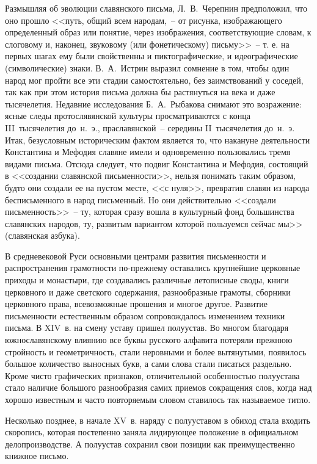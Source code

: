   Размышляя об эволюции славянского письма, Л.~В.~Черепнин предположил, что оно
  прошло <<путь, общий всем народам,~-- от рисунка, изображающего определенный
  образ или понятие, через изображения, соответствующие словам, к слоговому и,
  наконец, звуковому (или фонетическому) письму>>~-- т. е. на первых шагах ему
  были свойственны и пиктографические, и идеографические (символические) знаки.
  В.~А.~Истрин выразил сомнение в том, чтобы один народ мог пройти все эти
  стадии самостоятельно, без заимствований у соседей, так как при этом история
  письма должна бы растянуться на века и даже тысячелетия. Недавние
  исследования Б.~А.~Рыбакова снимают это возражение: ясные следы
  протослявянской культуры просматриваются с конца III~тысячелетия до~н.~э.,
  праславянской~-- середины II~тысячелетия до~н.~э. Итак, безусловным
  историческим фактом является то, что накануне деятельности Константина и
  Мефодия славяне имели и одновременно пользовались тремя видами письма. Отсюда
  следует, что подвиг Константина и Мефодия, состоящий в <<создании славянской
  письменности>>, нельзя понимать таким образом, будто они создали ее на пустом
  месте, <<с нуля>>, превратив славян из народа бесписьменного в народ
  письменный. Но они действительно <<создали письменность>>~-- ту, которая
  сразу вошла в культурный фонд большинства славянских народов, ту, развитым
  вариантом которой пользуемся сейчас мы>> (славянская азбука).
  
  В средневековой Руси основными центрами развития письменности и
  распространения грамотности по-прежнему оставались крупнейшие церковные
  приходы и монастыри, где создавались различные летописные своды, книги
  церковного и даже светского содержания, разнообразные грамоты, сборники
  церковного права, всевозможные прошения и многое другое. Развитие
  письменности естественным образом сопровождалось изменением техники письма. В
  XIV~в. на смену уставу пришел полуустав. Во многом благодаря южнославянскому
  влиянию все буквы русского алфавита потеряли прежнюю стройность и
  геометричность, стали неровными и более вытянутыми, появилось большое
  количество выносных букв, а сами слова стали писаться раздельно. Кроме чисто
  графических признаков, отличительной особенностью полуустава стало наличие
  большого разнообразия самих приемов сокращения слов, когда над хорошо
  известным и часто повторяемым словом ставилось так называемое титло.
  
  Несколько позднее, в начале XV~в. наряду с полууставом в обиход стала входить
  скоропись, которая постепенно заняла лидирующее положение в официальном
  делопроизводстве. А полуустав сохранил свои позиции как преимущественно
  книжное письмо.
  
